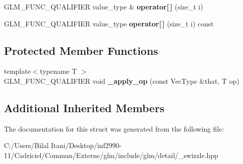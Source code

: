 \begin{DoxyCompactItemize}
\item 
G\+L\+M\+\_\+\+F\+U\+N\+C\+\_\+\+Q\+U\+A\+L\+I\+F\+I\+ER value\+\_\+type \& {\bfseries operator\mbox{[}$\,$\mbox{]}} (size\+\_\+t i)\hypertarget{structglm_1_1detail_1_1__swizzle__base2_aa3f2ab8e3e1a5c414b3fdca4cf75b706}{}\label{structglm_1_1detail_1_1__swizzle__base2_aa3f2ab8e3e1a5c414b3fdca4cf75b706}

\item 
G\+L\+M\+\_\+\+F\+U\+N\+C\+\_\+\+Q\+U\+A\+L\+I\+F\+I\+ER value\+\_\+type {\bfseries operator\mbox{[}$\,$\mbox{]}} (size\+\_\+t i) const \hypertarget{structglm_1_1detail_1_1__swizzle__base2_a1bec6727adac01b6bc3e1ccba935167e}{}\label{structglm_1_1detail_1_1__swizzle__base2_a1bec6727adac01b6bc3e1ccba935167e}

\end{DoxyCompactItemize}
\subsection*{Protected Member Functions}
\begin{DoxyCompactItemize}
\item 
{\footnotesize template$<$typename T $>$ }\\G\+L\+M\+\_\+\+F\+U\+N\+C\+\_\+\+Q\+U\+A\+L\+I\+F\+I\+ER void {\bfseries \+\_\+apply\+\_\+op} (const Vec\+Type \&that, T op)\hypertarget{structglm_1_1detail_1_1__swizzle__base2_a11d049274a60ecf4aac8cebc4c4e9be5}{}\label{structglm_1_1detail_1_1__swizzle__base2_a11d049274a60ecf4aac8cebc4c4e9be5}

\end{DoxyCompactItemize}
\subsection*{Additional Inherited Members}


The documentation for this struct was generated from the following file\+:\begin{DoxyCompactItemize}
\item 
C\+:/\+Users/\+Bilal Itani/\+Desktop/inf2990-\/11/\+Cadriciel/\+Commun/\+Externe/glm/include/glm/detail/\+\_\+swizzle.\+hpp\end{DoxyCompactItemize}
